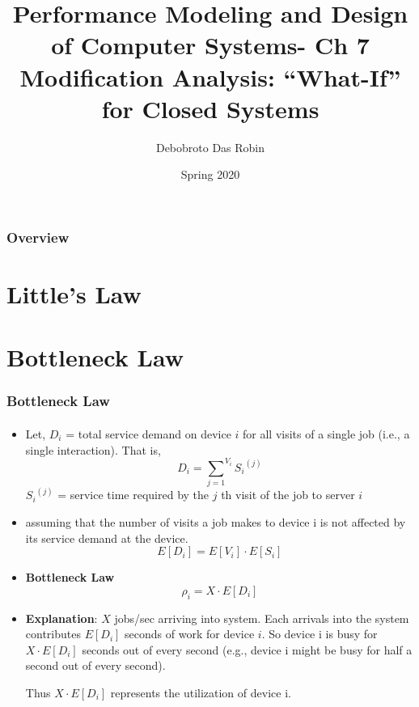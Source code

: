 \documentclass{beamer}
\title{Performance Modeling and
Design of Computer Systems- Ch 7 \\
Modification Analysis: ``What-If'' for Closed Systems }
\author{Debobroto Das Robin} %
\institute{Kent State University}
\date{Spring 2020}
\begin{document}
\begin{frame}
        \titlepage
        \begin{center}
    \href{mailto:drobin@kent.edu}{}
        \end{center}
\end{frame}

\begin{frame}
\frametitle{Overview} %
\tableofcontents %
\end{frame}



\section{Little’s Law}


\section{  Bottleneck Law}

\begin{frame}
\frametitle{  Bottleneck Law}
\framesubtitle{\textbf{\textit{}}}
\begin{itemize}
\item Let, $D_i$ =  total service demand on device $i$ for all visits of a single job (i.e., a single interaction). That is,
$$D_i = {{\sum}_{j=1}}^{V_i} {S_i}^{(j)}$$
${S_i}^{(j)}$ = service time required by the $j$ th visit of the job to server $i$
\item  assuming that the number of visits a job makes to device i is not affected by its service demand at the device.
$$E [D_i ] = E [V_i ] \cdot E [S_i ]$$

\item \textbf{Bottleneck Law} 
$$ {\rho}_i = X \cdot E[D_i] $$

\item  \textbf{Explanation}: $X$ jobs/sec arriving into system. Each  arrivals
into the system contributes $E [D_i ]$ seconds of work for device $i$. So device i is busy for $X \cdot E [D_i ]$ seconds out of every second (e.g., device i might be busy for half a second
out of every second). 

Thus $X \cdot E [D_i ]$ represents the utilization of device i.



\end{itemize}
	
\end{frame}
    
\end{document}

